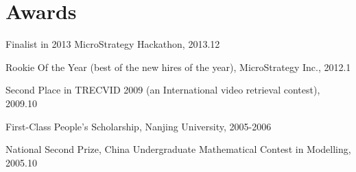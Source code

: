 \documentclass[letterpaper]{article}
\renewenvironment{itemize}{
  \begin{list}{}{
    \setlength{\leftmargin}{1.5em}
    \setlength{\itemsep}{0pt}
  }
}{
  \end{list}
}
\begin{document}
\section*{Awards}
\begin{itemize}
\item Finalist in 2013 MicroStrategy Hackathon, 2013.12
\item Rookie Of the Year (best of the new hires of the year), MicroStrategy Inc., 2012.1
\item Second Place in TRECVID 2009 (an International video retrieval contest), 2009.10
\item First-Class People's Scholarship, Nanjing University, 2005-2006
\item National Second Prize, China Undergraduate Mathematical Contest in Modelling, 2005.10
\end{itemize}
\end{document}
